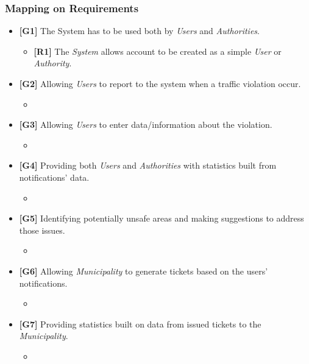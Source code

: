 \documentclass {article}
\begin{document}
	\subsubsection{Mapping on Requirements}
	\begin{itemize}
			 \item {\bf [G1]} The System has to be used both by {\it Users} and {\it Authorities}.
			 \begin{itemize}
			 \item {\bf [R1]} The {\it System} allows account to be created as a simple {\it User} or {\it Authority}.
			 \end{itemize}
   			 \item {\bf [G2]} Allowing {\it Users} to report to the system when a traffic violation occur.		
   			 \begin{itemize}
   			 \item 
			 \end{itemize}
			 \item {\bf [G3]} Allowing {\it Users} to enter data/information about the violation.
			 \begin{itemize}
			 \item 
			 \end{itemize}
   			 \item {\bf [G4]} Providing both {\it Users} and {\it Authorities} with statistics built from notifications’ data.    	
   			 \begin{itemize}
   			 \item 
			 \end{itemize}		  
   			 \item {\bf [G5]} Identifying potentially unsafe areas and making suggestions to address those issues.
   		    	\begin{itemize}
   		    	\item 
			 \end{itemize}
			  \item {\bf [G6]} Allowing {\it Municipality} to generate tickets based on the users’ notifications. 
			  \begin{itemize}
			  \item 
			 \end{itemize}
			  \item {\bf [G7]} Providing statistics built on data from issued tickets to the {\it Municipality}.		
			  \begin{itemize}
			  \item 
			 \end{itemize}
			  \end{itemize}
\end{document}
